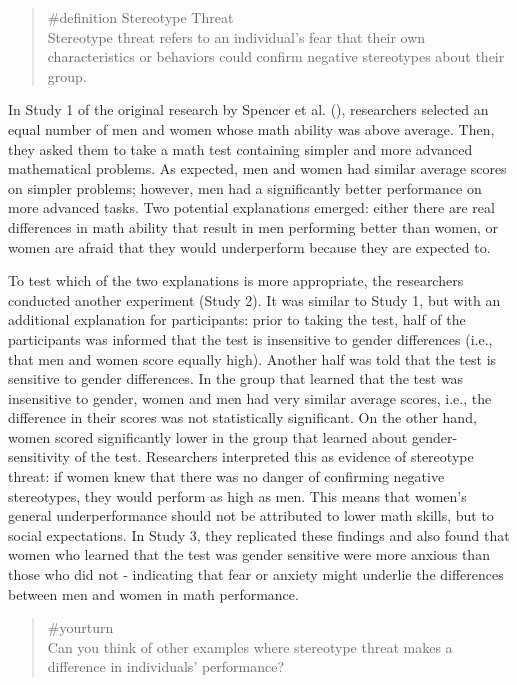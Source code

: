 \documentclass[
  letterpaper,
]{book}
\begin{document}
\begin{quote}
\label{def-stereotypethreat}{\#definition} Stereotype
Threat\\
Stereotype threat refers to an individual's fear that their own
characteristics or behaviors could confirm negative stereotypes about
their group.
\end{quote}

In Study 1 of the original research by Spencer et al.
(), researchers selected an
equal number of men and women whose math ability was above average.
Then, they asked them to take a math test containing simpler and more
advanced mathematical problems. As expected, men and women had similar
average scores on simpler problems; however, men had a significantly
better performance on more advanced tasks. Two potential explanations
emerged: either there are real differences in math ability that result
in men performing better than women, or women are afraid that they would
underperform because they are expected to.

To test which of the two explanations is more appropriate, the
researchers conducted another experiment (Study 2). It was similar to
Study 1, but with an additional explanation for participants: prior to
taking the test, half of the participants was informed that the test is
insensitive to gender differences (i.e., that men and women score
equally high). Another half was told that the test is sensitive to
gender differences. In the group that learned that the test was
insensitive to gender, women and men had very similar average scores,
i.e., the difference in their scores was not statistically significant.
On the other hand, women scored significantly lower in the group that
learned about gender-sensitivity of the test. Researchers interpreted
this as evidence of stereotype threat: if women knew that there was no
danger of confirming negative stereotypes, they would perform as high as
men. This means that women's general underperformance should not be
attributed to lower math skills, but to social expectations. In Study 3,
they replicated these findings and also found that women who learned
that the test was gender sensitive were more anxious than those who did
not - indicating that fear or anxiety might underlie the differences
between men and women in math performance.

\begin{quote}
{\#yourturn}\\
Can you think of other examples where stereotype threat makes a
difference in individuals' performance?
\end{quote}
\end{document}
